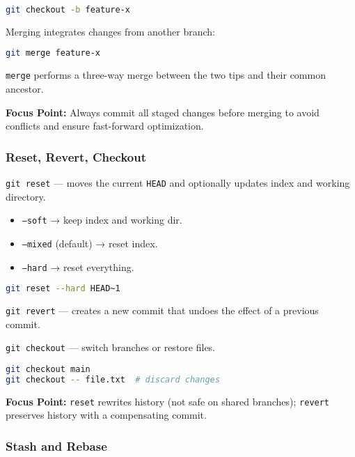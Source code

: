 \documentclass[a4paper,12pt]{article}
\begin{document}
\begin{lstlisting}[language=bash]
git checkout -b feature-x
\end{lstlisting}

Merging integrates changes from another branch:

\begin{lstlisting}[language=bash]
git merge feature-x
\end{lstlisting}

\texttt{merge} performs a three-way merge between the two tips and their common ancestor.

\textbf{Focus Point:} Always commit all staged changes before merging to avoid conflicts and ensure fast-forward optimization.

\subsubsection{Reset, Revert, Checkout}

\texttt{git reset} — moves the current \texttt{HEAD} and optionally updates index and working directory.

\begin{itemize}
  \item \texttt{--soft} → keep index and working dir.
  \item \texttt{--mixed} (default) → reset index.
  \item \texttt{--hard} → reset everything.
\end{itemize}

\begin{lstlisting}[language=bash]
git reset --hard HEAD~1
\end{lstlisting}

\texttt{git revert} — creates a new commit that undoes the effect of a previous commit.

\texttt{git checkout} — switch branches or restore files.

\begin{lstlisting}[language=bash]
git checkout main
git checkout -- file.txt  # discard changes
\end{lstlisting}

\textbf{Focus Point:} \texttt{reset} rewrites history (not safe on shared branches); \texttt{revert} preserves history with a compensating commit.

\subsubsection{Stash and Rebase}
\end{document}
